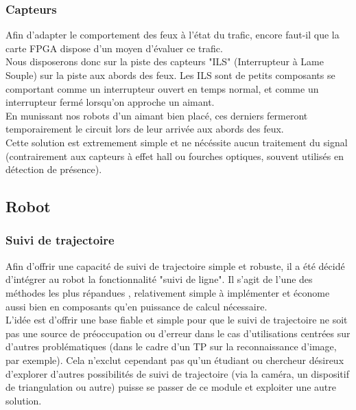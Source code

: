 	\subsubsection{Capteurs}

		Afin d'adapter le comportement des feux à l'état du trafic, encore faut-il que la carte FPGA dispose d'un moyen d'évaluer ce trafic.\\

		Nous disposerons donc sur la piste des capteurs "ILS" (Interrupteur à Lame Souple)  sur la piste aux abords des feux. Les ILS sont de petits composants se comportant comme un interrupteur ouvert en temps normal, et comme un interrupteur fermé lorsqu'on approche un aimant.\\

		En munissant nos robots d'un aimant bien placé, ces derniers fermeront temporairement le circuit lors de leur arrivée aux abords des feux.\\

		Cette solution est extremement simple et ne nécéssite aucun traitement du signal (contrairement aux capteurs à effet hall ou fourches optiques, souvent utilisés en détection de présence).

\newpage
\subsection{Robot}

	\subsubsection{Suivi de trajectoire}

		Afin d’offrir une capacité de suivi de trajectoire simple et robuste, il a été décidé d’intégrer au robot la fonctionnalité "suivi de ligne". Il s’agit de l’une des méthodes les plus répandues\cite{bib3} \cite{bib4}, relativement simple à implémenter et économe aussi bien en composants qu’en puissance de calcul nécessaire.\\

		L’idée est d’offrir une base fiable et simple pour que le suivi de trajectoire ne soit pas une source de préoccupation ou d’erreur dans le cas d'utilisations centrées sur d’autres problématiques (dans le cadre d'un TP sur la reconnaissance d'image, par exemple). Cela n’exclut cependant pas qu’un étudiant ou chercheur désireux d’explorer d’autres possibilités de suivi de trajectoire (via la caméra, un dispositif de triangulation ou autre) puisse se passer de ce module et exploiter une autre solution.\\

